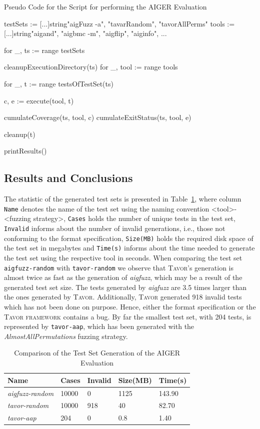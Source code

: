 \begin{listing}
\caption{Pseudo Code for the Script for performing the AIGER Evaluation}
\label{lst:evaluation-script}
\begin{gocode}
testSets := [...]string{"aigFuzz -a", "tavarRandom", "tavorAllPerms"}
tools := [...]string{"aigand", "aigbmc -m", "aigflip", "aiginfo", ...}

for _, ts := range testSets {
  cleanupExecutionDirectory(ts)
  for _, tool := range tools {
    for _, t := range testsOfTestSet(ts) {
      c, e := execute(tool, t)

      cumulateCoverage(ts, tool, c)
      cumulateExitStatus(ts, tool, e)

      cleanup(t)
    }
  }
}

printResults()
\end{gocode}
\end{listing}

\subsection{Results and Conclusions}
\label{subsec:evaluationAigerResultsConclusions}

The statistic of the generated test sets is presented in Table~\ref{table:evaluationAIGERGeneration}, where column \texttt{Name} denotes the name of the test set using the naming convention <tool>-<fuzzing strategy>, \texttt{Cases} holds the number of unique tests in the test set, \texttt{Invalid} informs about the number of invalid generations, i.e., those not conforming to the format specification, \texttt{Size(MB)} holds the required disk space of the test set in megabytes and \texttt{Time(s)} informs about the time needed to generate the test set using the respective tool in seconds. When comparing the test set \texttt{aigfuzz-random} with \texttt{tavor-random} we observe that \textsc{Tavor}'s generation is almost twice as fast as the generation of \emph{aigfuzz}, which may be a result of the generated test set size. The tests generated by \emph{aigfuzz} are 3.5 times larger than the ones generated by \textsc{Tavor}. Additionally, \textsc{Tavor} generated 918 invalid tests which has not been done on purpose. Hence, either the format specification or the \textsc{Tavor framework} contains a bug. By far the smallest test set, with 204 tests, is represented by \texttt{tavor-aap}, which has been generated with the \emph{AlmostAllPermutations} fuzzing strategy.

\begin{table}
\caption{Comparison of the Test Set Generation of the AIGER Evaluation}
\label{table:evaluationAIGERGeneration}
\center
\begin{tabular}{| l | l | l | l | l |}
\hline \textbf{Name} & \textbf{Cases} & \textbf{Invalid} & \textbf{Size(MB)} & \textbf{Time(s)} \tabularnewline
\hline \emph{aigfuzz-random} & 10000 & 0 & 1125 & 143.90 \tabularnewline
\hline \emph{tavor-random} & 10000 & 918 & 40 & 82.70 \tabularnewline
\hline \emph{tavor-aap} & 204 & 0 & 0.8 & 1.40 \tabularnewline
\hline \end{tabular}
\end{table}

